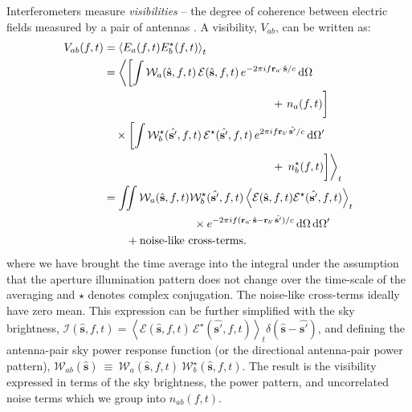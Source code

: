 \documentclass[a4paper,fleqn,usenatbib]{mnras}
\newcommand{\dif}{\mathrm{d}}
\begin{document}
Interferometers measure {\it visibilities} -- the degree of coherence between electric fields measured by a pair of antennas \citep{van34,zer38,tho01}. A visibility, $V_{ab}$, can be written as:
\begin{align}
  V_{ab}(f,t) &= \left\langle E_a(f,t)E_b^\star(f,t) \right\rangle_t \label{eqn:cc-vis}\hfill\\
              &= \left\langle \left[ \int \mathcal{W}_a(\hat{\mathbf{s}},f,t)\,\mathcal{E}(\hat{\mathbf{s}},f,t)\,e^{-2\pi i f\mathbf{r}_a\!\cdot\,\hat{\mathbf{s}}/c}\,\dif\Omega\right.\right. \nonumber\\
              &\qquad\qquad\qquad\qquad\qquad\qquad\qquad\quad + \left. n_a(f,t) \vphantom{\int}\right] \nonumber\\
              &\quad \times \left[ \int \mathcal{W}^\star_b(\hat{\mathbf{s'}},f,t)\,\mathcal{E}^\star (\hat{\mathbf{s'}},f,t)\,e^{2\pi i f\mathbf{r}_b\!\cdot\,\hat{\mathbf{s'}}/c}\,\dif\Omega^\prime \right. \nonumber\\
              &\qquad\qquad\qquad\qquad\qquad\qquad\qquad\quad + \left.\left. n^\star_b(f,t) \vphantom{\int}\right] \right\rangle_t \nonumber\\
              &= \iint \mathcal{W}_a(\hat{\mathbf{s}},f,t) \mathcal{W}^\star_b(\hat{\mathbf{s'}},f,t) \left\langle \mathcal{E}(\hat{\mathbf{s}},f,t) \mathcal{E}^\star(\hat{\mathbf{s'}},f,t) \right\rangle_t \nonumber\\
              &\qquad\qquad\qquad\qquad \times e^{-2\pi i f(\mathbf{r}_a\!\cdot\,\hat{\mathbf{s}}-\mathbf{r}_b\!\cdot\,\hat{\mathbf{s'}})/c}\,\dif\Omega\,\dif\Omega^\prime \nonumber\\
              &\qquad +\textrm{noise-like cross-terms.}
\end{align}
where we have brought the time average into the integral under the assumption that the aperture illumination pattern does not change over the time-scale of the averaging and $\star$ denotes complex conjugation. The noise-like cross-terms ideally have zero mean. This expression can be further simplified with the sky brightness, $\mathcal{I}(\hat{\mathbf{s}},f,t)= \left\langle \mathcal{E}(\hat{\mathbf{s}},f,t)\,\mathcal{E}^\star(\hat{\mathbf{s'}},f,t) \right\rangle_t \delta(\hat{\mathbf{s}}-\hat{\mathbf{s'}})$, and defining the antenna-pair sky power response function (or the directional antenna-pair power pattern), $\mathcal{W}_{ab}(\hat{\mathbf{s}})~\equiv~\mathcal{W}_a(\hat{\mathbf{s}},f,t)~\mathcal{W}^\star_b(\hat{\mathbf{s}},f,t)$. The result is the visibility expressed in terms of the sky brightness, the power pattern, and uncorrelated noise terms which we group into $n_{ab}(f,t)$.
\end{document}
